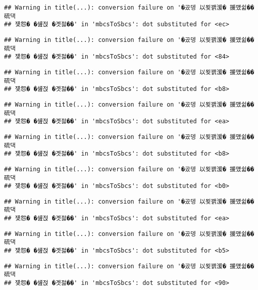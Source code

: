 \documentclass[
]{article}
\begin{document}
\begin{verbatim}
## Warning in title(...): conversion failure on '�곴뎅 以묒꽭湲� 援먰쉶�� 硫댁
## 쟻怨� �섎젅 �곗젏��' in 'mbcsToSbcs': dot substituted for <ec>
\end{verbatim}

\begin{verbatim}
## Warning in title(...): conversion failure on '�곴뎅 以묒꽭湲� 援먰쉶�� 硫댁
## 쟻怨� �섎젅 �곗젏��' in 'mbcsToSbcs': dot substituted for <84>
\end{verbatim}

\begin{verbatim}
## Warning in title(...): conversion failure on '�곴뎅 以묒꽭湲� 援먰쉶�� 硫댁
## 쟻怨� �섎젅 �곗젏��' in 'mbcsToSbcs': dot substituted for <b8>
\end{verbatim}

\begin{verbatim}
## Warning in title(...): conversion failure on '�곴뎅 以묒꽭湲� 援먰쉶�� 硫댁
## 쟻怨� �섎젅 �곗젏��' in 'mbcsToSbcs': dot substituted for <ea>
\end{verbatim}

\begin{verbatim}
## Warning in title(...): conversion failure on '�곴뎅 以묒꽭湲� 援먰쉶�� 硫댁
## 쟻怨� �섎젅 �곗젏��' in 'mbcsToSbcs': dot substituted for <b8>
\end{verbatim}

\begin{verbatim}
## Warning in title(...): conversion failure on '�곴뎅 以묒꽭湲� 援먰쉶�� 硫댁
## 쟻怨� �섎젅 �곗젏��' in 'mbcsToSbcs': dot substituted for <b0>
\end{verbatim}

\begin{verbatim}
## Warning in title(...): conversion failure on '�곴뎅 以묒꽭湲� 援먰쉶�� 硫댁
## 쟻怨� �섎젅 �곗젏��' in 'mbcsToSbcs': dot substituted for <ea>
\end{verbatim}

\begin{verbatim}
## Warning in title(...): conversion failure on '�곴뎅 以묒꽭湲� 援먰쉶�� 硫댁
## 쟻怨� �섎젅 �곗젏��' in 'mbcsToSbcs': dot substituted for <b5>
\end{verbatim}

\begin{verbatim}
## Warning in title(...): conversion failure on '�곴뎅 以묒꽭湲� 援먰쉶�� 硫댁
## 쟻怨� �섎젅 �곗젏��' in 'mbcsToSbcs': dot substituted for <90>
\end{verbatim}
\end{document}

